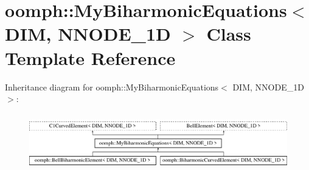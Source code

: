 \hypertarget{classoomph_1_1MyBiharmonicEquations}{}\section{oomph\+:\+:My\+Biharmonic\+Equations$<$ D\+IM, N\+N\+O\+D\+E\+\_\+1D $>$ Class Template Reference}
\label{classoomph_1_1MyBiharmonicEquations}
Inheritance diagram for oomph\+:\+:My\+Biharmonic\+Equations$<$ D\+IM, N\+N\+O\+D\+E\+\_\+1D $>$\+:\begin{figure}[H]
\begin{center}
\leavevmode
\includegraphics[height=2.500000cm]{classoomph_1_1MyBiharmonicEquations}
\end{center}
\end{figure}

